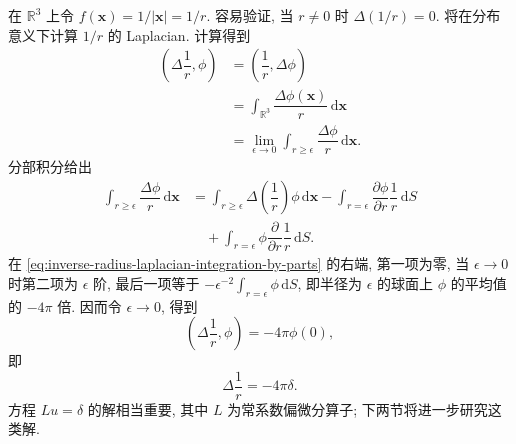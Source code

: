 \begin{Example}
\label{ex:inverse-radius-laplacian}
在 $\mathbb{R}^3$ 上令 $f(\bm{x})=1/|\bm{x}|=1/r$. 容易验证, 当 $r\ne0$ 时 $\Delta(1/r)=0$. 将在分布意义下计算 $1/r$ 的 Laplacian. 计算得到\[
\begin{aligned}
\left(\Delta\dfrac1r,\phi\right)&=\left(\dfrac1r,\Delta\phi\right)\\
&=\int_{\mathbb{R}^3}\dfrac{\Delta\phi(\bm{x})}r\,\mathrm{d}\bm{x}\\
&=\lim_{\epsilon\to0}\int_{r\geq\epsilon}\dfrac{\Delta\phi}r\,\mathrm{d}\bm{x}.
\end{aligned}
\]分部积分给出
\begin{equation}\label{eq:inverse-radius-laplacian-integration-by-parts}
\begin{aligned}
\int_{r\geq\epsilon}\dfrac{\Delta\phi}r\,\mathrm{d}\bm{x}
&=\int_{r\geq\epsilon}\Delta\left(\dfrac1r\right)\phi\,\mathrm{d}\bm{x}
-\int_{r=\epsilon}\dfrac{\partial\phi}{\partial r}\dfrac1r\,\mathrm{d}S\\
&\quad+\int_{r=\epsilon}\phi\dfrac{\partial}{\partial r}\dfrac1r\,\mathrm{d}S.
\end{aligned}
\end{equation}
在 \eqref{eq:inverse-radius-laplacian-integration-by-parts} 的右端, 第一项为零, 当 $\epsilon\to0$ 时第二项为 $\epsilon$ 阶, 最后一项等于 $-\epsilon^{-2}\int_{r=\epsilon}\phi\,\mathrm{d}S$, 即半径为 $\epsilon$ 的球面上 $\phi$ 的平均值的 $-4\pi$ 倍. 因而令 $\epsilon\to0$, 得到
\begin{equation}\label{eq:inverse-radius-laplacian-delta-pairing}
\left(\Delta\dfrac1r,\phi\right)=-4\pi\phi(0),
\end{equation}
即
\begin{equation}\label{eq:inverse-radius-laplacian-delta}
\Delta\dfrac1r=-4\pi\delta.
\end{equation}
方程 $Lu=\delta$ 的解相当重要, 其中 $L$ 为常系数偏微分算子; 下两节将进一步研究这类解.
\end{Example}

